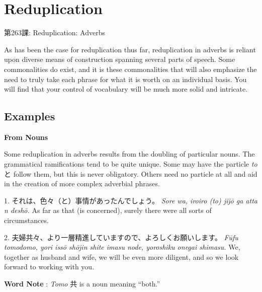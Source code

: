     
\chapter{Reduplication}

\begin{center}
\begin{Large}
第263課: Reduplication: Adverbs 
\end{Large}
\end{center}
 
\par{ As has been the case for reduplication thus far, reduplication in adverbs is reliant upon diverse means of construction spanning several parts of speech. Some commonalities do exist, and it is these commonalities that will also emphasize the need to truly take each phrase for what it is worth on an individual basis. You will find that your control of vocabulary will be much more solid and intricate. }
      
\section{Examples}
 
\begin{center}
\textbf{From Nouns }
\end{center}

\par{ Some reduplication in adverbs results from the doubling of particular nouns. The grammatical ramifications tend to be quite unique. Some may have the particle \emph{to }と follow them, but this is never obligatory. Others need no particle at all and aid in the creation of more complex adverbial phrases. }

\par{1. それは、色々（と）事情があったんでしょう。 \hfill\break
 \emph{Sore wa, iroiro (to) jijō ga atta n deshō. \hfill\break
 }As far as that (is concerned), surely there were all sorts of circumstances. }

\par{2. 夫婦共々、より一層精進していますので、よろしくお願いします。 \hfill\break
 \emph{Fūfu tomodomo, yori issō shōjin shite imasu node, yoroshiku onegai shimasu. }\hfill\break
We, together as husband and wife, we will be even more diligent, and so we look forward to working with you. }

\par{\textbf{Word Note }: \emph{Tomo }共 is a noun meaning “both.” }

